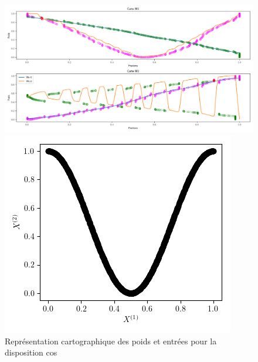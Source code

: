 \begin{figure}
	\begin{minipage}{0.66\textwidth}
	\includegraphics[width=\textwidth]{2som_cos_w.pdf}
	\caption{Représentation cartographique des poids et entrées pour la disposition cos}
	\end{minipage}
	\begin{minipage}{0.33\textwidth}
		\includegraphics[width=\textwidth]{2som_cos_in.png}
	\end{minipage}
\end{figure}

